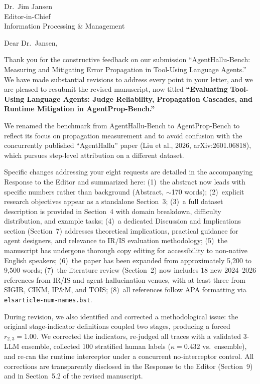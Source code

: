 \documentclass[11pt]{letter}
\begin{document}
\begin{letter}{Dr.\ Jim Jansen\\Editor-in-Chief\\Information Processing \& Management}

\opening{Dear Dr.\ Jansen,}

Thank you for the constructive feedback on our submission
``AgentHallu-Bench: Measuring and Mitigating Error Propagation in
Tool-Using Language Agents.''
We have made substantial revisions to address every point in your letter,
and we are pleased to resubmit the revised manuscript, now titled
\textbf{``Evaluating Tool-Using Language Agents: Judge Reliability,
Propagation Cascades, and Runtime Mitigation in AgentProp-Bench.''}

We renamed the benchmark from AgentHallu-Bench to AgentProp-Bench to
reflect its focus on propagation measurement and to avoid confusion with
the concurrently published ``AgentHallu'' paper (Liu et al., 2026,
arXiv:2601.06818), which pursues step-level attribution on a different
dataset.

Specific changes addressing your eight requests are detailed in the
accompanying Response to the Editor and summarized here:
(1)~the abstract now leads with specific numbers rather than background
(Abstract, ${\sim}$170 words);
(2)~explicit research objectives appear as a standalone Section~3;
(3)~a full dataset description is provided in Section~4 with domain
breakdown, difficulty distribution, and example tasks;
(4)~a dedicated Discussion and Implications section (Section~7) addresses
theoretical implications, practical guidance for agent designers, and
relevance to IR/IS evaluation methodology;
(5)~the manuscript has undergone thorough copy editing for accessibility
to non-native English speakers;
(6)~the paper has been expanded from approximately 5,200 to 9,500 words;
(7)~the literature review (Section~2) now includes 18 new 2024--2026
references from IR/IS and agent-hallucination venues, with at least
three from SIGIR, CIKM, IP\&M, and TOIS;
(8)~all references follow APA formatting via \texttt{elsarticle-num-names.bst}.

During revision, we also identified and corrected a methodological issue:
the original stage-indicator definitions coupled two stages, producing a
forced $r_{2,3}=1.00$. We corrected the indicators, re-judged all traces
with a validated 3-LLM ensemble, collected 100 stratified human labels
($\kappa=0.432$ vs.\ ensemble), and re-ran the runtime interceptor under
a concurrent no-interceptor control. All corrections are transparently
disclosed in the Response to the Editor (Section~9) and in Section~5.2
of the revised manuscript.


\end{letter}
\end{document}
